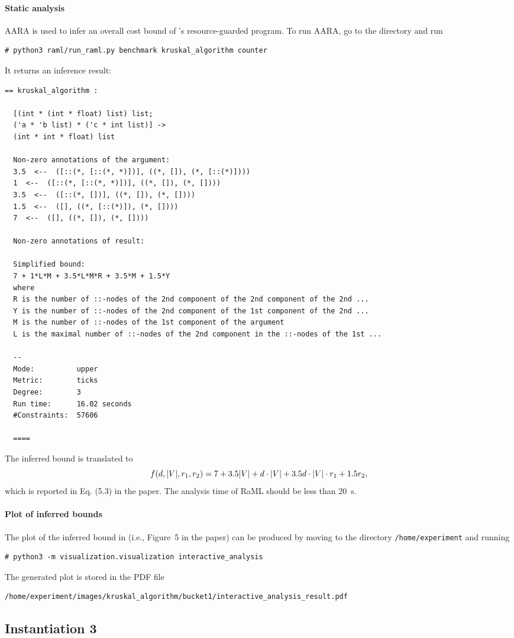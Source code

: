 \paragraph{Static analysis}

AARA is used to infer an overall cost bound of \kruskal{}'s resource-guarded
program.
%
To run AARA, go to the directory  and run
\begin{verbatim}
# python3 raml/run_raml.py benchmark kruskal_algorithm counter
\end{verbatim}
%
It returns an inference result:
\begin{Verbatim}[fontsize=\footnotesize]
  == kruskal_algorithm :

  [(int * (int * float) list) list;
  ('a * 'b list) * ('c * int list)] ->
  (int * int * float) list

  Non-zero annotations of the argument:
  3.5  <--  ([::(*, [::(*, *)])], ((*, []), (*, [::(*)])))
  1  <--  ([::(*, [::(*, *)])], ((*, []), (*, [])))
  3.5  <--  ([::(*, [])], ((*, []), (*, [])))
  1.5  <--  ([], ((*, [::(*)]), (*, [])))
  7  <--  ([], ((*, []), (*, [])))

  Non-zero annotations of result:

  Simplified bound:
  7 + 1*L*M + 3.5*L*M*R + 3.5*M + 1.5*Y
  where
  R is the number of ::-nodes of the 2nd component of the 2nd component of the 2nd ...
  Y is the number of ::-nodes of the 2nd component of the 1st component of the 2nd ...
  M is the number of ::-nodes of the 1st component of the argument
  L is the maximal number of ::-nodes of the 2nd component in the ::-nodes of the 1st ...

  --
  Mode:          upper
  Metric:        ticks
  Degree:        3
  Run time:      16.02 seconds
  #Constraints:  57606

  ====
\end{Verbatim}
%
The inferred bound is translated to
\begin{equation}
  f (d, |{V}|, r_1, r_2) = 7 + 3.5 |{V}| + d \cdot |{V}| + 3.5 d \cdot |{V}| \cdot r_1 + 1.5 r_2,
\end{equation}
which is reported in Eq. (5.3) in the paper.
%
The analysis time of RaML should be less than \qty{20}{\second}.

\paragraph{Plot of inferred bounds}

The plot of the inferred bound in \kruskal{} (i.e., Figure~5 in the paper) can be produced
by moving to the directory \texttt{/home/experiment} and running
\begin{verbatim}
# python3 -m visualization.visualization interactive_analysis
\end{verbatim}
%
The generated plot is stored in the PDF file
\begin{verbatim}
/home/experiment/images/kruskal_algorithm/bucket1/interactive_analysis_result.pdf
\end{verbatim}

\subsection{Instantiation 3}
\label{sec:step-by-step-instructions:instantiation-3}
